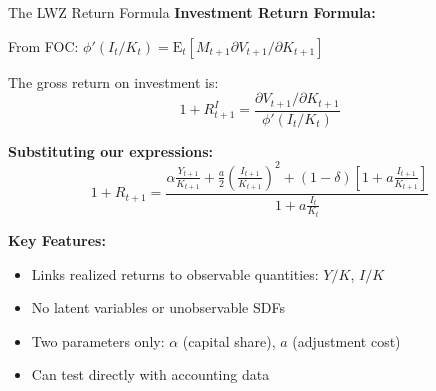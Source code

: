 \documentclass{beamer}
\begin{document}
\begin{frame}{The LWZ Return Formula}
    \textbf{Investment Return Formula:}
    
    From FOC: $\phi'(I_t/K_t) = \mathrm{E}_t[M_{t+1} \partial V_{t+1}/\partial K_{t+1}]$
    
    The gross return on investment is:
    \begin{equation*}
        1 + R_{t+1}^I = \frac{\partial V_{t+1}/\partial K_{t+1}}{\phi'(I_t/K_t)}
    \end{equation*}
    
    \textbf{Substituting our expressions:}
    \begin{equation}\label{equ:lwz return}
        \boxed{
        1 + R_{t+1} = \frac{\alpha \frac{Y_{t+1}}{K_{t+1}} + \frac{a}{2}\left(\frac{I_{t+1}}{K_{t+1}}\right)^2 + (1-\delta)\left[1 + a\frac{I_{t+1}}{K_{t+1}}\right]}{1 + a\frac{I_t}{K_t}}
        }
    \end{equation}
    
    
    \textbf{Key Features:}
    \begin{itemize}
        \item Links realized returns to observable quantities: $Y/K$, $I/K$
        \item No latent variables or unobservable SDFs
        \item Two parameters only: $\alpha$ (capital share), $a$ (adjustment cost)
        \item Can test directly with accounting data
    \end{itemize}
\end{frame}
\end{document}
